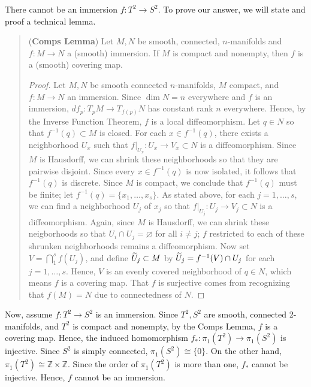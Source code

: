 \documentclass{article}
\begin{document}
\begin{solutions}
	There cannot be an immersion $f: T^{2} \to S^{2}$. To prove our answer, we will state and proof a technical lemma. 
	\begin{quote}
		(\textbf{Comps Lemma}) Let $M, N$ be smooth, connected, $n$-manifolds and $f: M \to N$ a (smooth) immersion. If $M$ is compact and nonempty, then $f$ is a (smooth) covering map. 
		\begin{proof}
			Let $M, N$ be smooth connected $n$-manifolds, $M$ compact, and $f: M \to N$ an immersion. Since $\dim{N} = n$ everywhere and $f$ is an immersion, $df_{p}: T_{p}M \to T_{f(p)}N$ has constant rank $n$ everywhere. Hence, by the Inverse Function Theorem, $f$ is a local diffeomorphism. Let $q \in N$ so that $f^{-1}(q) \subset M$ is closed. For each $x \in f^{-1}(q)$, there exists a neighborhood $U_{x}$ such that $f|_{U_{x}}: U_{x} \to V_{x} \subset N$ is a diffeomorphism. Since $M$ is Hausdorff, we can shrink these neighborhoods so that they are pairwise disjoint. Since every $x \in f^{-1}(q)$ is now isolated, it follows that $f^{-1}(q)$ is discrete. Since $M$ is compact, we conclude that $f^{-1}(q)$ must be finite; let $f^{-1}(q) = \{x_{1}, \ldots, x_{s}\}$. As stated above, for each $j = 1, \ldots, s$, we can find a neighborhood $U_{j}$ of $x_{j}$ so that $f|_{U_{j}}: U_{j} \to V_{j} \subset N$ is a diffeomorphism. Again, since $M$ is Hausdorff, we can shrink these neigborhoods so that $U_{i} \cap U_{j} = \varnothing$ for all $i \neq j$; $f$ restricted to each of these shrunken neighborhoods remains a diffeomorphism. Now set $V = \bigcap_{1}^{s}f(U_{j})$, and define $\widetilde{U}_{j} \subset M$ by $\widetilde{U}_{j} = f^{-1}(V) \cap U_{j}$ for each $j = 1, \ldots, s$. Hence, $V$ is an evenly covered neighborhood of $q \in N$, which means $f$ is a covering map. That $f$ is surjective comes from recognizing that $f(M) = N$ due to connectedness of $N$. 
		\end{proof}
	\end{quote}
	
	Now, assume $f: T^{2} \to S^{2}$ is an immersion. Since $T^{2}, S^{2}$ are smooth, connected 2-manifolds, and $T^{2}$ is compact and nonempty, by the Comps Lemma, $f$ is a covering map. Hence, the induced homomorphism $f_{\ast}: \pi_{1}(T^{2})\to \pi_{1}(S^{2})$ is injective. Since $S^{2}$ is simply connected, $\pi_{1}(S^{2}) \cong \{0\}$. On the other hand, $\pi_{1}(T^{2}) \cong \mathbb{Z} \times \mathbb{Z}$. Since the order of $\pi_{1}(T^{2})$ is more than one, $f_{\ast}$ cannot be injective. Hence, $f$ cannot be an immersion. 
\end{solutions}
\end{document}
